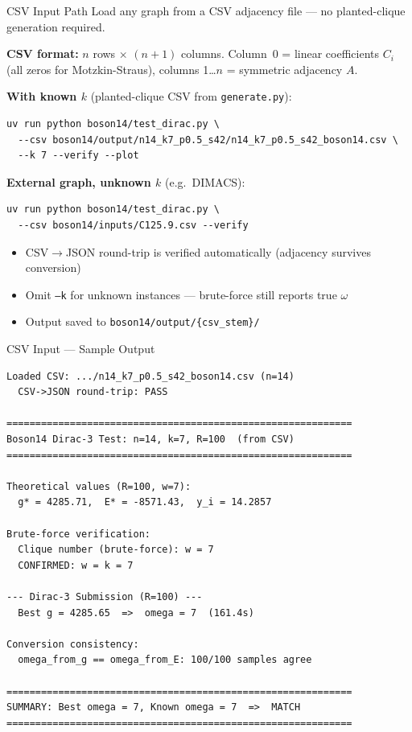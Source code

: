 \documentclass[aspectratio=169]{beamer}
\begin{document}
\begin{frame}[fragile]{CSV Input Path}
    Load any graph from a CSV adjacency file --- no planted-clique generation required.

    \vspace{0.3em}
    \textbf{CSV format:} $n$ rows $\times$ $(n{+}1)$ columns. Column~0 = linear coefficients $C_i$ (all zeros for Motzkin-Straus), columns 1\ldots$n$ = symmetric adjacency $A$.

    \vspace{0.5em}
    \textbf{With known $k$} (planted-clique CSV from \texttt{generate.py}):
\begin{lstlisting}[style=shell,numbers=none]
uv run python boson14/test_dirac.py \
  --csv boson14/output/n14_k7_p0.5_s42/n14_k7_p0.5_s42_boson14.csv \
  --k 7 --verify --plot
\end{lstlisting}

    \textbf{External graph, unknown $k$} (e.g.\ DIMACS):
\begin{lstlisting}[style=shell,numbers=none]
uv run python boson14/test_dirac.py \
  --csv boson14/inputs/C125.9.csv --verify
\end{lstlisting}

    \vspace{0.3em}
    \begin{itemize}
        \item CSV$\to$JSON round-trip is verified automatically (adjacency survives conversion)
        \item Omit \texttt{--k} for unknown instances --- brute-force still reports true $\omega$
        \item Output saved to \texttt{boson14/output/\{csv\_stem\}/}
    \end{itemize}
\end{frame}


\begin{frame}[fragile]{CSV Input --- Sample Output}
\begin{lstlisting}[numbers=none,basicstyle=\ttfamily\scriptsize]
Loaded CSV: .../n14_k7_p0.5_s42_boson14.csv (n=14)
  CSV->JSON round-trip: PASS

============================================================
Boson14 Dirac-3 Test: n=14, k=7, R=100  (from CSV)
============================================================

Theoretical values (R=100, w=7):
  g* = 4285.71,  E* = -8571.43,  y_i = 14.2857

Brute-force verification:
  Clique number (brute-force): w = 7
  CONFIRMED: w = k = 7

--- Dirac-3 Submission (R=100) ---
  Best g = 4285.65  =>  omega = 7  (161.4s)

Conversion consistency:
  omega_from_g == omega_from_E: 100/100 samples agree

============================================================
SUMMARY: Best omega = 7, Known omega = 7  =>  MATCH
============================================================
\end{lstlisting}
\end{frame}
\end{document}
